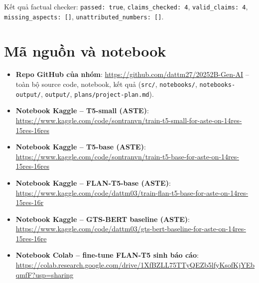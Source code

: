 \documentclass[11pt,a4paper]{article}
\begin{document}
Kết quả factual checker: \texttt{passed: true}, \texttt{claims\_checked:
4}, \texttt{valid\_claims: 4}, \texttt{missing\_aspects: []},
\texttt{unattributed\_numbers: []}.


\clearpage
\section*{Mã nguồn và notebook}

\begin{itemize}
    \item \textbf{Repo GitHub của nhóm}:
        \url{https://github.com/dattm27/20252B-Gen-AI} -- toàn bộ source
        code, notebook, kết quả (\texttt{src/}, \texttt{notebooks/},
        \texttt{notebooks-\allowbreak output/}, \texttt{output/},
        \texttt{plans/\allowbreak project-\allowbreak plan.md}).
    \item \textbf{Notebook Kaggle -- T5-small (ASTE)}:
        \url{https://www.kaggle.com/code/sontranvn/train-t5-small-for-aste-on-14res-15res-16res}
    \item \textbf{Notebook Kaggle -- T5-base (ASTE)}:
        \url{https://www.kaggle.com/code/sontranvn/train-t5-base-for-aste-on-14res-15res-16res}
    \item \textbf{Notebook Kaggle -- FLAN-T5-base (ASTE)}:
        \url{https://www.kaggle.com/code/dattm03/train-flan-t5-base-for-aste-on-14res-15res-16r}
    \item \textbf{Notebook Kaggle -- GTS-BERT baseline (ASTE)}:
        \url{https://www.kaggle.com/code/dattm03/gts-bert-baseline-for-aste-on-14res-15res-16re}
    \item \textbf{Notebook Colab -- fine-tune FLAN-T5 sinh báo cáo}:
        \url{https://colab.research.google.com/drive/1XfBZLL75TTyQEZb5lfyKsofKjYEbqmfF?usp=sharing}
\end{itemize}
\end{document}
